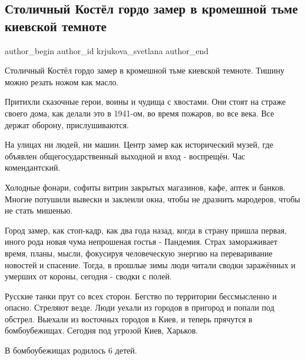  
 
 
 
 
 
\subsection{Столичный Костёл гордо замер в кромешной тьме киевской темноте}
\label{sec:27_02_2022.fb.krjukova_svetlana.1.stolichnyj_kostel}
 
\ifcmt
 author_begin
   author_id krjukova_svetlana
 author_end
\fi

Столичный Костёл гордо замер в кромешной тьме киевской темноте. Тишину можно
резать ножом как масло. 

Притихли сказочные герои, воины и чудища с хвостами. Они стоят на страже своего
дома, как делали это в 1941-ом, во время пожаров, во все века. Все держат
оборону, прислушиваются. 

На улицах ни людей, ни машин. Центр замер как исторический музей, где объявлен
общегосударственный выходной и вход - воспрещён. Час комендантский.

Холодные фонари, софиты витрин закрытых магазинов, кафе, аптек и банков. Многие
потушили вывески и заклеили окна, чтобы не дразнить мародеров, чтобы не стать
мишенью. 

Город замер, как стоп-кадр, как два года назад, когда в страну пришла первая,
иного рода новая чума непрошеная гостья - Пандемия. Страх замораживает время,
планы, мысли, фокусируя человеческую энергию на переваривание новостей и
спасение. Тогда, в прошлые зимы люди читали сводки заражённых и умерших от
короны, сегодня - сводки с полей. 

Русские танки прут со всех сторон. Бегство по территории бессмысленно и опасно.
Стреляют везде. Люди уехали из городов в пригород и попали под обстрел. Выехали
из восточных городов в Киев, и теперь прячутся в бомбоубежищах. Сегодня под
угрозой Киев, Харьков. 

В бомбоубежищах родилось 6 детей. 


